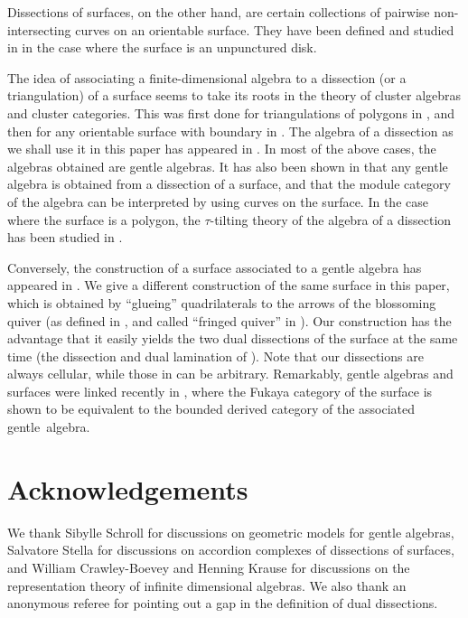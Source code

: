 \documentclass{amsart}
\theoremstyle{definition}
\begin{document}
Dissections of surfaces, on the other hand, are certain collections of pairwise non-intersecting curves on an orientable surface.
They have been defined and studied in \cite{Baryshnikov, Chapoton-quadrangulations, GarverMcConville, MannevillePilaud-accordion} in the case where the surface is an unpunctured disk.

The idea of associating a finite-dimensional algebra to a dissection (or a triangulation) of a surface seems to take its roots in the theory of cluster algebras and cluster categories.
This was first done for triangulations of polygons in \cite{CalderoChapotonSchiffler}, and then for any orientable surface with boundary in \cite{ABCP, Labardini}.  
The algebra of a dissection as we shall use it in this paper has appeared in \cite{DavidRoeslerSchiffler}.
In most of the above cases, the algebras obtained are gentle algebras.
It has also been shown in \cite{BaurCoelhoSimoes} that any gentle algebra is obtained from a dissection of a surface, and that the module category of the algebra can be interpreted by using curves on the surface.
In the case where the surface is a polygon, the $\tau$-tilting theory of the algebra of a dissection has been studied in \cite{PaluPilaudPlamondon, PilaudPlamondonStella}.

Conversely, the construction of a surface associated to a gentle algebra has appeared in \cite{OpperPlamondonSchroll}.
We give a different construction of the same surface in this paper, which is obtained by ``glueing'' quadrilaterals to the arrows of the blossoming quiver (as defined in \cite{PaluPilaudPlamondon}, and called ``fringed quiver'' in \cite{BrustleDouvilleMousavandThomasYildirim}).
Our construction has the advantage that it easily yields the two dual dissections of the surface at the same time (the dissection and dual lamination of \cite{OpperPlamondonSchroll}).
Note that our dissections are always cellular, while those in \cite{BaurCoelhoSimoes} can be arbitrary.
Remarkably, gentle algebras and surfaces were linked recently in \cite{HaidenKatzarkovKontsevich, LekiliPolishchuk}, where the Fukaya category of the surface is shown to be equivalent to the bounded derived category of the associated gentle~algebra.

\section*{Acknowledgements}
We thank Sibylle Schroll for discussions on geometric models for gentle algebras, Salvatore Stella for discussions on accordion complexes of dissections of surfaces, and William Crawley-Boevey and Henning Krause for discussions on the representation theory of infinite dimensional algebras. We also thank an anonymous referee for pointing out a gap in the definition of dual dissections.
\end{document}
